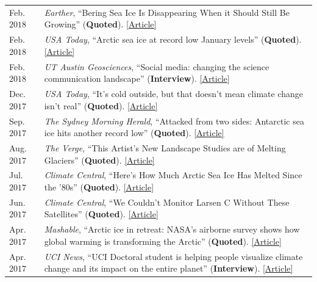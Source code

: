 \documentclass[margin,line,palatino,courier,10pt]{res}
\begin{document}
\begin{resume}
\begin{tabular}{@{}p{0.8in}p{4in}}
Feb. $2018$ & \textit{Earther}, ``Bering Sea Ice Is Disappearing When it Should Still Be Growing'' (\textbf{Quoted}). \href{https://earther.com/bering-sea-ice-is-disappearing-at-a-time-when-it-should-1823193914}{[Article]}\\
Feb. $2018$ & \textit{USA Today}, ``Arctic sea ice at record low January levels'' (\textbf{Quoted}). \href{https://www.usatoday.com/story/weather/2018/02/20/arctic-sea-ice-record-low-january-levels/355738002/}{[Article]}\\
Feb. $2018$ & \textit{UT Austin Geosciences}, ``Social media: changing the science communication landscape'' (\textbf{Interview}). \href{https://www.jsg.utexas.edu/science-yall/social-media-landscape/}{[Article]}\\
Dec. $2017$ & \textit{USA Today}, ``It's cold outside, but that doesn't mean climate change isn't real'' (\textbf{Quoted}). \href{https://www.usatoday.com/story/weather/2017/12/28/its-cold-outside-but-doesnt-mean-climate-change-isnt-real/987948001/}{[Article]}\\
Sep. $2017$ & \textit{The Sydney Morning Herald}, ``Attacked from two sides: Antarctic sea ice hits another record low'' (\textbf{Quoted}). \href{http://www.smh.com.au/environment/climate-change/attacked-from-two-sides-antarctic-sea-ice-hits-another-record-low-20170926-gyouuc.html}{[Article]}\\
Aug. $2017$ & \textit{The Verge}, ``This Artist's New Landscape Studies are of Melting Glaciers'' (\textbf{Quoted}). \href{http://sites.uci.edu/zlabe/media-and-outreach/?preview_id=567&preview_nonce=d7dd77fe7a&_thumbnail_id=-1&preview=true}{[Article]}\\
Jul. $2017$ & \textit{Climate Central}, ``Here's How Much Arctic Sea Ice Has Melted Since the '$80$s'' (\textbf{Quoted}). \href{http://www.climatecentral.org/news/arctic-sea-ice-melt-since-the-80s-21637}{[Article]}\\
Jun. $2017$ & \textit{Climate Central}, ``We Couldn't Monitor Larsen C Without These Satellites'' (\textbf{Quoted}). \href{http://www.climatecentral.org/news/larsen-c-monitoring-satellites-21564}{[Article]}\\
Apr. $2017$ & \textit{Mashable}, ``Arctic ice in retreat: NASA's airborne survey shows how global warming is transforming the Arctic'' (\textbf{Quoted}). \href{http://mashable.com/2017/04/13/arctic-meltdown-nasa-photos-changing-ice/?utm_cid=hp-n-1#BgdepWyM6Pq3}{[Article]}\\
Apr. $2017$ & \textit{UCI News}, ``UCI Doctoral student is helping people visualize climate change and its impact on the entire planet'' (\textbf{Interview}). \href{http://grad.uci.edu/news-and-events/student-spotlights/Zachary-Labe.html}{[Article]}\\

\end{tabular}
\end{resume}
\end{document}
